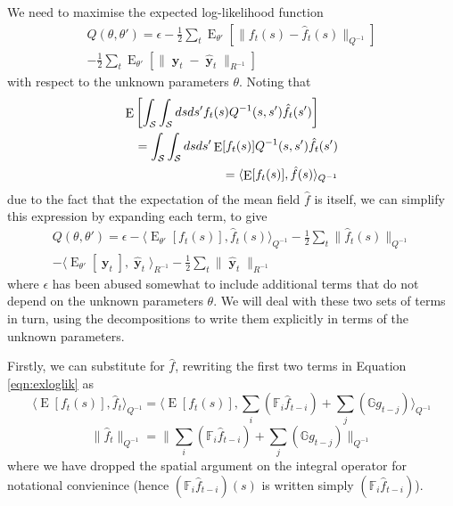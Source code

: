 \documentclass{IEEEtran}
\newcommand{\inner}[3]{\langle#1,#2\rangle_{#3}}
\newcommand{\dist}[2]{\|#1\|_{#2}}
\DeclareMathOperator{\E}{E}
\DeclareMathOperator{\yvec}{\mathbf{y}}
\begin{document}
We need to maximise the expected log-likelihood function
\begin{equation}
	\label{eqn:exploglik}
	\begin{split}
	Q(\theta,\theta') = \epsilon - \frac{1}{2}\sum_t\E_{\theta'}[\dist{f_t(s) - \hat{f}_t(s)}{Q^{-1}}]  \\
	- \frac{1}{2}\sum_t\E_{\theta'}[\dist{\yvec_t-\hat{\yvec}_t}{R^{-1}}]
	\end{split}
\end{equation}
with respect to the unknown parameters $\theta$. Noting that 
\begin{eqnarray}
	\lefteqn{\E\left[\int_\mathcal{S}\int_\mathcal{S}ds ds' f_t(s) Q^{-1}(s,s') \hat{f}_t(s')\right] } \nonumber \\ 
		&& = \int_\mathcal{S}\int_\mathcal{S}ds ds' \E[f_t(s)] Q^{-1}(s,s') \hat{f}_t(s') \\
		&& = \inner{\E[f_t(s)]}{\hat{f}(s)}{Q^{-1}}
\end{eqnarray}
due to the fact that the expectation of the mean field $\hat{f}$ is itself, we can simplify this expression by expanding each term, to give
\begin{equation}
	\begin{split}
	\label{eqn:exloglik}
	Q(\theta,\theta') = \epsilon
	- \inner{\E_{\theta'}[f_t(s)]}{\hat{f}_t(s)}{Q^{-1}}
	- \frac{1}{2}\sum_t \dist{\hat{f}_t(s)}{Q^{-1}} \\
	- \inner{\E_{\theta'}[\yvec_t]}{\hat{\yvec}_t}{R^{-1}}
	- \frac{1}{2}\sum_t \dist{\hat{\yvec}_t}{R^{-1}}
	\end{split}
\end{equation}
where $\epsilon$ has been abused somewhat to include additional terms that do not depend on the unknown parameters $\theta$. We will deal with these two sets of terms in turn, using the decompositions to write them explicitly in terms of the unknown parameters.

Firstly, we can substitute for $\hat{f}$, rewriting the first two terms in Equation \ref{eqn:exloglik} as
\begin{equation}
	\label{eqn:Eff}
	\inner{\E[f_t(s)]}{\hat{f}_t}{Q^{-1}} = \inner{\E[f_t(s)]}{\sum_i(\mathbb{F}_i\hat{f}_{t-i}) + \sum_j(\mathbb{G}g_{t-j})}{Q^{-1}}
\end{equation}
\begin{equation}
	\label{eqn:fhat}
	\dist{\hat{f}_t}{Q^{-1}} = \dist{\sum_i(\mathbb{F}_i\hat{f}_{t-i}) + \sum_j(\mathbb{G}g_{t-j})}{Q^{-1}}
\end{equation}
where we have dropped the spatial argument on the integral operator for notational convienince (hence $(\mathbb{F}_i\hat{f}_{t-i})(s)$ is written simply $(\mathbb{F}_i\hat{f}_{t-i})$). 
\end{document}
